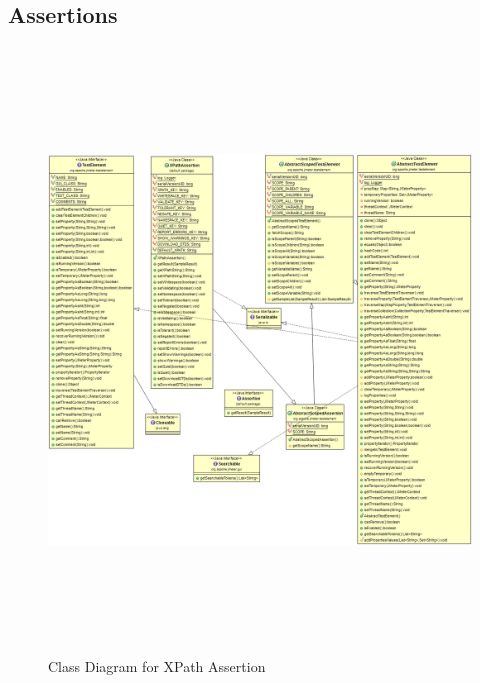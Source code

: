 \documentclass[12pt]{book}
\begin{document}
  \subsection{Assertions}
  \begin{figure}[H]
   \centering
   \includegraphics[width=17cm, height=16cm]{images/assertions_xpath}
   \caption{Class Diagram for XPath Assertion\label{fig:fig2_JMeter}}
  \end{figure}
  
\end{document}
